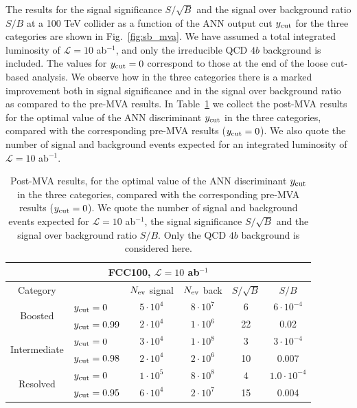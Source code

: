 \documentclass[a4paper,10pt]{article}
\begin{document}
The results for the signal significance $S/\sqrt{B}$ and
the signal over background ratio
$S/B$ at a 100 TeV collider as a function of the ANN output cut $y_{\rm cut}$
for the three categories are shown in 
Fig.~\ref{fig:sb_mva}.
%
We have assumed a total integrated luminosity of $\mathcal{L}=10$ ab$^{-1}$, and only the
irreducible QCD $4b$ background is included.
%
The values 
for $y_{\rm cut}=0$ correspond to those at
the end of the loose cut-based analysis.
%
We observe how in the three
 categories there is a marked  improvement both in signal
 significance and in the signal over
 background ratio as compared to the pre-MVA results.
 In Table~\ref{table:cutflowMVA} we collect
 the post-MVA results for the optimal value of the
    ANN discriminant $y_{\rm cut}$ in the three categories, compared with the
    corresponding
    pre-MVA results ($y_{\rm cut}=0$).
    We also quote the number of signal and
    background events expected for an integrated
    luminosity of $\mathcal{L}=10$ ab$^{-1}$.



\begin{table}[t]
  \centering
  \begin{tabular}{|c|l|c|c|c|c|}
    \hline
    \multicolumn{6}{|c|}{FCC100, $\mathcal{L}=10$ ab$^{-1}$} \\
    \hline
    \hline
    Category  &   &  $N_{\rm ev}$ signal &  $N_{\rm ev}$ back  &  $S/\sqrt{B}$ & $S/B$ \\ 
    \hline
    \hline
    \multirow{2}{*}{Boosted} &  $y_{\rm cut}=0$  &       $5\cdot 10^4$    &   $8\cdot 10^7$        &  6        &    $6\cdot 10^{-4}$         \\
    &  $y_{\rm cut}=0.99$ &   $2\cdot 10^4$    &  $1\cdot 10^6$         &      22    &    0.02     \\
    \hline
    \hline
    \multirow{2}{*}{Intermediate} &  $y_{\rm cut}=0$  &   $3\cdot 10^4$     & $1\cdot 10^8$  & 3   &  $3\cdot 10^{-4}$ \\
       &  $y_{\rm cut}=0.98$ &         $2\cdot 10^4$       &  $2\cdot 10^6$   &  10   & 0.007         \\
    \hline
    \hline
      \multirow{2}{*}{Resolved} &  $y_{\rm cut}=0$  &  $1\cdot 10^5$      & $8\cdot 10^8$  &   4  & $1.0\cdot 10^{-4}$  \\
    &  $y_{\rm cut}=0.95 $ &    $6\cdot 10^4$    &   $2\cdot 10^7$        &    15      &    0.004     \\
    \hline
      \end{tabular}
  \caption{\small Post-MVA results, for the optimal value of the
    ANN discriminant $y_{\rm cut}$ in the three categories, compared with the
    corresponding
    pre-MVA results ($y_{\rm cut}=0$).
    We quote the number of signal and
    background events expected for $\mathcal{L}=10$ ab$^{-1}$,
    the signal significance $S/\sqrt{B}$ and
    the signal over background ratio $S/B$.
    Only the QCD $4b$ background is considered here.
    \label{table:cutflowMVA}
  }
\end{table}
\end{document}
